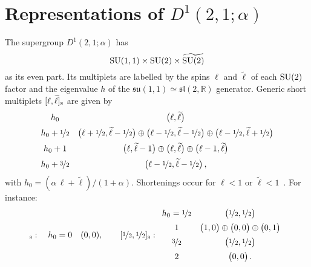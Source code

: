 \documentclass[a4paper, 11pt]{article}
\numberwithin{equation}{section}
\newcommand{\ts}[1]{\widetilde{#1}}
\newcommand{\+}{\oplus}
\begin{document}
\section{Representations of \texorpdfstring{$D^{1}(2,1;\alpha)$}{D(2,1,a)}} \label{app:d21a}
The supergroup $D^{1}(2,1;\alpha)$ has
\begin{equation}
	{\rm SU}(1,1)\times{\rm SU}(2)\times\ts{{\rm SU}(2)}
\end{equation}
as its even part. Its multiplets are labelled by the spins $\ell$ and $\ts{\ell}$ of each ${\rm SU}(2)$ factor and the eigenvalue $h$ of the $\mathfrak{su}(1,1)\simeq\mathfrak{sl}(2,\mathbb{R})$ generator. Generic short multiplets $[\ell,\ts{\ell}]_{\rm s}$ are given by~\cite{deBoer:1999gea,Eberhardt:2017fsi}
\begin{equation}
	\begin{array}{cc}
	 h_{0} & \big(\ell,\ts{\ell}\big) \\[5pt]
	 h_{0} + \nicefrac{1}{2} & \big(\ell+\nicefrac{1}{2},\ts{\ell}-\nicefrac{1}{2}\big) \oplus \big(\ell-\nicefrac{1}{2},\ts{\ell}-\nicefrac{1}{2}\big) \oplus \big(\ell-\nicefrac{1}{2},\ts{\ell}+\nicefrac{1}{2}\big) \\[5pt]
	 h_{0}+1 & \big(\ell,\ts{\ell}-1\big) \oplus \big(\ell,\ts{\ell}\big) \oplus \big(\ell-1,\ts{\ell}\big) \\[5pt]
	 h_{0} + \nicefrac{3}{2} & \big(\ell-\nicefrac{1}{2},\ts{\ell}-\nicefrac{1}{2}\big)\,,
	\end{array}
\end{equation}
with $h_{0}=(\alpha\,\ell+\ts{\ell})/(1+\alpha)$. Shortenings occur for $\ell<1$ or $\ts{\ell}<1$~\cite{deBoer:1999gea}. For instance:
\begin{equation}
	[0,0]_{\rm s}:\quad h_{0}=0 \quad (0,0),\qquad  [\nicefrac{1}{2},\nicefrac{1}{2}]_{\rm s}: \begin{array}{cc}
	 h_{0}=\nicefrac{1}{2} & \big(\nicefrac{1}{2},\nicefrac{1}{2}\big) \\[5pt]
	 1 & \big(1,0\big) \oplus \big(0,0\big) \oplus \big(0,1\big) \\[5pt]
	 \nicefrac{3}{2} & \big(\nicefrac{1}{2},\nicefrac{1}{2}\big) \\[5pt]
	 2 & \big(0,0\big)\,.
	\end{array}
\end{equation}
\end{document}
